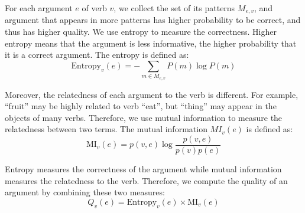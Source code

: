 For each argument $e$ of verb $v$, we collect the set of its patterns $M_{e,v}$,
and argument that appears in more patterns has higher probability to be correct,
and thus has higher quality. We use entropy to measure the correctness. Higher
entropy means that the argument is less informative,
the higher probability that it is a correct argument. The entropy is defined as:
\begin{equation}
\text{Entropy}_v(e)=-\sum_{m\in M_{e,v}}{P(m)\log{P(m)}}
\end{equation}

Moreover, the relatedness of each argument to the verb is different. For example,
``fruit'' may be highly related to verb ``eat'', but ``thing'' may appear in the objects
of many verbs. Therefore, we use mutual information to measure the relatedness
between two terms. The mutual information $MI_v(e)$ is defined as:
\begin{equation}
\text{MI}_v(e)=p(v,e)\log \frac{p(v,e)}{p(v)p(e)}
\end{equation}

Entropy measures the correctness of the argument while mutual information measures
the relatedness to the verb. Therefore, we compute the quality of an argument by
combining these two measures:
\begin{equation}
Q_v(e)=\text{Entropy}_v(e)\times \text{MI}_v(e)
\label{eq:qe}
\end{equation}


